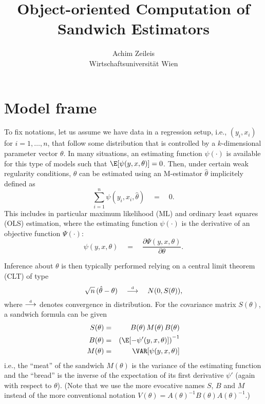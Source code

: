 \documentclass{Z}
\author{Achim Zeileis\\Wirtschaftsuniversit\"at Wien}
\title{Object-oriented Computation of Sandwich Estimators}
\newcommand{\darrow}{\stackrel{\mbox{\tiny \textnormal{d}}}{\longrightarrow}}
\begin{document}


\section{Model frame}

To fix notations, let us assume we have data in a regression setup, i.e., 
$(y_i, x_i)$ for $i = 1, \dots, n$, that follow some distribution that is 
controlled by a $k$-dimensional parameter vector $\theta$. In many situations,
an estimating function $\psi(\cdot)$ is available for this type of models
such that $\E[\psi(y, x, \theta)] = 0$. Then, under certain weak regularity
conditions, %
$\theta$ can be estimated using an M-estimator $\hat \theta$ implicitely defined as
  \begin{equation} \label{eq:estfun}
    \sum_{i = 1}^n \psi(y_i, x_i, \hat \theta) \quad = \quad 0.
  \end{equation}
This includes in particular maximum likelihood (ML) and ordinary least
squares (OLS) estimation, where the estimating function $\psi(\cdot)$ is
the derivative of an objective function $\Psi(\cdot)$:
  \begin{equation} \label{eq:score}
    \psi(y, x, \theta) \quad = \quad \frac{\partial \Psi(y, x, \theta)}{\partial \theta}.
  \end{equation}

Inference about $\theta$ is then typically performed relying on a central
limit theorem (CLT) of type
  \begin{equation} \label{eq:clt}
    \sqrt{n} \, (\hat \theta - \theta) \quad \darrow \quad N(0, S(\theta)),
  \end{equation}
where $\darrow$ denotes convergence in distribution. For the covariance matrix
$S(\theta)$, a sandwich formula can be given
\begin{eqnarray} \label{eq:sandwich}
  S(\theta) & = & B(\theta) \, M(\theta) \, B(\theta) \\  \label{eq:bread}
  B(\theta) & = & \left( \E[ - \psi'(y, x, \theta) ] \right)^{-1} \\  \label{eq:meat}
  M(\theta) & = & \VAR[ \psi(y, x, \theta) ]
\end{eqnarray}
i.e., the ``meat'' of the sandwich $M(\theta)$ is the variance of the estimating
function and the ``bread'' is the inverse of the expectation of its first derivative $\psi'$
(again with respect to $\theta$). (Note that we use the more evocative names $S$,
$B$ and $M$ instead of the more conventional notation $V(\theta) = A(\theta)^{-1} B(\theta)
A(\theta)^{-1}$.)
\end{document}
